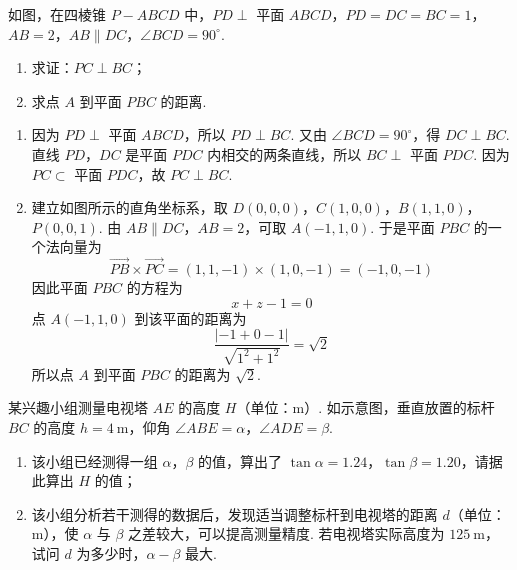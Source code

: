 \begin{problem}
如图，在四棱锥 \(P-ABCD\) 中，\(PD \perp\) 平面 \(ABCD\)，\(PD=DC=BC=1\)，\(AB=2\)，\(AB \parallel DC\)，\(\angle BCD=90^\circ\).

\begin{enumerate}
\item 求证：\(PC \perp BC\)；
\item 求点 \(A\) 到平面 \(PBC\) 的距离.
\end{enumerate}

\end{problem}

\begin{solution}
\begin{enumerate}
\item 因为 \(PD\perp\) 平面 \(ABCD\)，所以 \(PD\perp BC\). 又由 \(\angle BCD=90^\circ\)，得 \(DC\perp BC\). 直线 \(PD\)，\(DC\) 是平面 \(PDC\) 内相交的两条直线，所以 \(BC\perp\) 平面 \(PDC\). 因为 \(PC\subset\) 平面 \(PDC\)，故 \(PC\perp BC\).

\item 建立如图所示的直角坐标系，取
\(D(0,0,0)\)，\(C(1,0,0)\)，\(B(1,1,0)\)，\(P(0,0,1)\).
由 \(AB\parallel DC\)，\(AB=2\)，可取 \(A(-1,1,0)\). 于是平面 \(PBC\) 的一个法向量为
\[
\overrightarrow{PB}\times\overrightarrow{PC}
=(1,1,-1)\times(1,0,-1)=(-1,0,-1)
\]
因此平面 \(PBC\) 的方程为
\[
x+z-1=0
\]
点 \(A(-1,1,0)\) 到该平面的距离为
\[
\frac{|-1+0-1|}{\sqrt{1^2+1^2}}=\sqrt{2}
\]
所以点 \(A\) 到平面 \(PBC\) 的距离为 \(\sqrt{2}\).
\end{enumerate}
\end{solution}

\begin{problem}
某兴趣小组测量电视塔 \(AE\) 的高度 \(H\)（单位：\(\mathrm{m}\)）. 如示意图，垂直放置的标杆 \(BC\) 的高度 \(h=4 \mathrm{~m}\)，仰角 \(\angle ABE=\alpha\)，\(\angle ADE=\beta\).

\begin{enumerate}
\item 该小组已经测得一组 \(\alpha\)，\(\beta\) 的值，算出了 \(\tan\alpha=1.24\)，\(\tan\beta=1.20\)，请据此算出 \(H\) 的值；
\item 该小组分析若干测得的数据后，发现适当调整标杆到电视塔的距离 \(d\)（单位：\(\mathrm{m}\)），使 \(\alpha\) 与 \(\beta\) 之差较大，可以提高测量精度. 若电视塔实际高度为 \(125 \mathrm{~m}\)，试问 \(d\) 为多少时，\(\alpha-\beta\) 最大.
\end{enumerate}

\end{problem}

